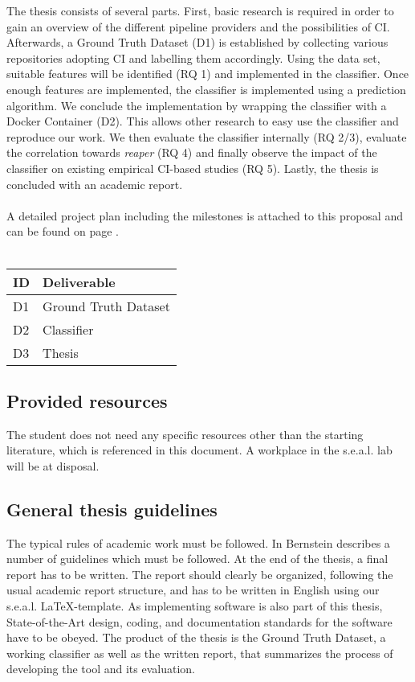 \documentclass{task_description}
\begin{document}
The thesis consists of several parts. First, basic research is required in order to gain an overview of the different pipeline providers and the possibilities of CI. Afterwards, a Ground Truth Dataset (D1) is established by collecting various repositories adopting CI and labelling them accordingly. Using the data set, suitable features will be identified (RQ 1) and implemented in the classifier. Once enough features are implemented, the classifier is implemented using a prediction algorithm. We conclude the implementation by wrapping the classifier with a Docker Container (D2). This allows other research to easy use the classifier and reproduce our work. We then evaluate the classifier internally (RQ 2/3), evaluate the correlation towards \textit{reaper} (RQ 4) and finally observe the impact of the classifier on existing empirical CI-based studies (RQ 5). Lastly, the thesis is concluded with an academic report.
\\\\
A detailed project plan including the milestones is attached to this proposal and can be found on page \pageref{gantt}.
\\\\
\begin{tabular}{lp{10cm}}  
 ID & Deliverable \\
\hline\noalign{\smallskip}
 D1 & Ground Truth Dataset \\
 D2 & Classifier \\
 D3 & Thesis\\
\hline
\end{tabular}

\subsection*{Provided resources}

The student does not need any specific resources other than the starting literature, which is referenced in this document. A workplace in the s.e.a.l. lab will be at disposal.

\newpage
\subsection*{General thesis guidelines}

The typical rules of academic work must be followed. In Bernstein \cite{Bernstein:8} describes a number of guidelines which must be followed. At the end of the thesis, a final report has to be written. The report should clearly be organized, following the usual academic report structure, and has to be written in English using our s.e.a.l. \LaTeX-template. As implementing software is also part of this thesis, State-of-the-Art
design, coding, and documentation standards for the software have to be obeyed. The product of the thesis is the Ground Truth Dataset, a working classifier as well as the written report, that summarizes the process of developing the tool and its evaluation.
\end{document}
